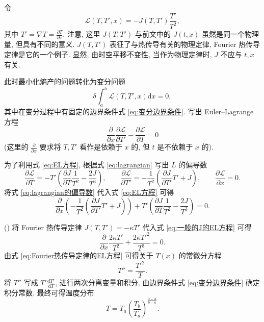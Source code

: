 \documentclass{article}
\newcounter{para}
\newcommand\mypara{\par\refstepcounter{para}(\thepara)\space}
\begin{document}
令
\begin{equation}
\mathcal L\!\left(T,T',x\right)=-J\!\left(T,T'\right)\frac{T'}{T^2},
\label{eq:lagrangian}
\end{equation}
其中 $T'=\nabla T=\frac{\partial T}{\partial x}$.
注意, 这里 $J\!\left(T,T'\right)$ 与前文中的 $J\!\left(t,x\right)$ 虽然是同一个物理量, 但具有不同的意义.
$J\!\left(T,T'\right)$ 表征了与热传导有关的物理定律, Fourier 热传导定律是它的一个例子.
显然, 由时空平移不变性, 当作为物理定律时, $J$ 不应与 $t,x$ 有关.

此时最小化熵产的问题转化为变分问题
\begin{equation}
\delta\int_a^b\mathcal L\!\left(T,T',x\right)\mathrm dx=0,
\end{equation}
其中在变分过程中有固定的边界条件式 \ref{eq:变分边界条件}.
写出 Euler--Lagrange 方程
\begin{equation}
\frac{\partial}{\partial x}\frac{\partial\mathcal L}{\partial T'}-\frac{\partial\mathcal L}{\partial T}=0
\label{eq:EL方程}
\end{equation}
(这里的 $\frac{\partial}{\partial x}$ 要求将 $T,T'$ 看作是依赖于 $x$ 的, 但 $t$ 是不依赖于 $x$ 的).

为了利用式 \ref{eq:EL方程}, 根据式 \ref{eq:lagrangian} 写出 $L$ 的偏导数
\begin{equation}
\frac{\partial\mathcal L}{\partial T}=-T'\left(\frac{\partial J}{\partial T}\frac1{T^2}-\frac{2J}{T^3}\right),
\qquad\frac{\partial\mathcal L}{\partial T'}=-\frac{1}{T^2}\left(\frac{\partial J}{\partial T'}T'+J\right),
\qquad\frac{\partial\mathcal L}{\partial x}=0.
\label{eq:lagrangian的偏导数}
\end{equation}
将式 \ref{eq:lagrangian的偏导数} 代入式 \ref{eq:EL方程} 可得
\begin{equation}
\frac{\partial}{\partial x}\left(-\frac{1}{T^2}\left(\frac{\partial J}{\partial T'}T'+J\right)\right)+T'\left(\frac{\partial J}{\partial T}\frac1{T^2}-\frac{2J}{T^3}\right)=0.
\label{eq:一般的J的EL方程}
\end{equation}

\mypara
将 Fourier 热传导定律 $J\left(T,T'\right)=-\kappa T'$ 代入式 \ref{eq:一般的J的EL方程} 可得
\begin{equation}
	\frac{\partial}{\partial x}\frac{2\kappa T'}{T^2}+\frac{2\kappa T'^2}{T^3}=0.
	\label{eq:Fourier热传导定律的EL方程}
\end{equation}
由式 \ref{eq:Fourier热传导定律的EL方程} 可得关于 $T\left(x\right)$ 的常微分方程
\begin{equation}
	T''=\frac{T'^2}{T}.
\end{equation}
将 $T''$ 写成 $T'\frac{\mathrm dT'}{\mathrm dT}$, 进行两次分离变量和积分, 由边界条件式 \ref{eq:变分边界条件} 确定积分常数.
最终可得温度分布
\begin{equation}
	T=T_a\left(\frac{T_b}{T_a}\right)^{\frac{x-a}{b-a}}.
\end{equation}
\end{document}
